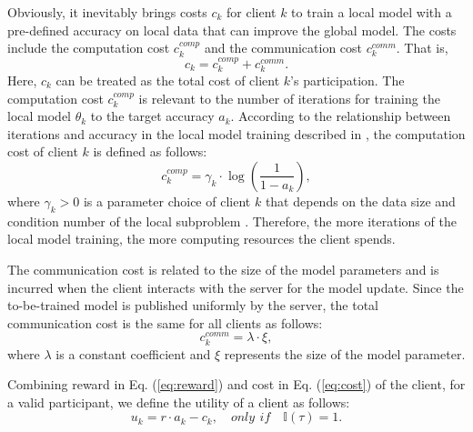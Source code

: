\documentclass[final,1p,times]{elsarticle}
\begin{document}
Obviously, it inevitably brings costs $c_k$ for client $k$ to train a local model with a pre-defined accuracy on local data that can improve the global model. The costs include the computation cost $c_k^{comp}$ and the communication cost $c_k^{comm}$. That is, 
\begin{equation}\label{eq:cost}
	c_k	= c_k^{comp} + c_k^{comm}.
\end{equation}
Here, $c_k$ can be treated as the total cost of client $k$'s participation. The computation cost $c_k^{comp}$ is relevant to the number of iterations for training the local model $\theta_k$ to the target accuracy $a_k$. According to the relationship between iterations and accuracy in the local model training described in \citep{pandey2020crowdsourcing}, the computation cost of client $k$ is defined as follows:
\begin{equation}
	c_k^{comp} = \gamma_k\cdot \log(\frac{1}{1-a_k}),
\end{equation}
where $\gamma_k>0$ is a parameter choice of client $k$ that depends on the data size and condition number of the local subproblem \citep{konevcny2017semi}. Therefore, the more iterations of the local model training, the more computing resources the client spends.

The communication cost is related to the size of the model parameters and is incurred when the client interacts with the server for the model update. Since the to-be-trained model is published uniformly by the server, the total communication cost is the same for all clients as follows:
\begin{equation}
	c_k^{comm} = \lambda\cdot\xi,
\end{equation}
where $\lambda$ is a constant coefficient and $\xi$ represents the size of the model parameter.

Combining reward in Eq. (\ref{eq:reward}) and cost in Eq. (\ref{eq:cost}) of the client, for a valid participant, we define the utility of a client as follows:
\begin{equation}\label{eq:client-u}
	u_k = r\cdot a_k - c_k, \quad only\,\: if\quad\mathbb{I}(\tau) = 1.
\end{equation}
\end{document}
